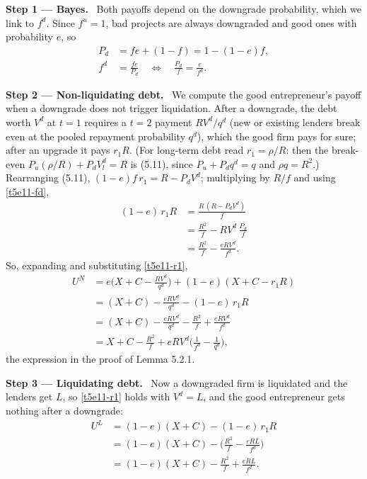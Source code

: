 \documentclass[11pt,a4paper]{article}
\newcommand{\step}[2]{\par\medskip\noindent\textbf{Step #1 --- #2.}~}
\begin{document}
\step{1}{Bayes} Both payoffs depend on the downgrade probability, which we link to $f^d$. Since $f^u=1$,
bad projects are always downgraded and good ones with probability $e$, so
\begin{align}
  P_d &= fe+(1-f) = 1-(1-e)f, \label{t5e11-Pd}\\
  f^d &= \frac{fe}{P_d}\quad\Longleftrightarrow\quad \frac{P_d}{f}=\frac{e}{f^d}. \label{t5e11-fd}
\end{align}

\step{2}{Non-liquidating debt} We compute the good entrepreneur's payoff when a downgrade does not
trigger liquidation. After a downgrade, the debt worth $V^d$ at $t=1$ requires a $t=2$ payment
$RV^d/q^d$ (new or existing lenders break even at the pooled repayment probability $q^d$), which the good
firm pays for sure; after an upgrade it pays $r_1R$. (For long-term debt read $r_1=\rho/R$: then the
break-even $P_u(\rho/R)+P_dV_l^d=R$ is (5.11), since $P_u+P_dq^d=q$ and $\rho q=R^2$.) Rearranging (5.11),
$(1-e)f\,r_1=R-P_dV^d$; multiplying by $R/f$ and using \eqref{t5e11-fd},
\begin{align}
  (1-e)\,r_1R &= \frac{R\,(R-P_dV^d)}{f} \nonumber\\
              &= \frac{R^2}{f}-RV^d\,\frac{P_d}{f} \nonumber\\
              &= \frac{R^2}{f}-\frac{eRV^d}{f^d}. \label{t5e11-r1}
\end{align}
So, expanding and substituting \eqref{t5e11-r1},
\begin{align}
  U^N &= e\Big(X+C-\frac{RV^d}{q^d}\Big)+(1-e)(X+C-r_1R) \nonumber\\
      &= (X+C)-\frac{eRV^d}{q^d}-(1-e)\,r_1R \nonumber\\
      &= (X+C)-\frac{eRV^d}{q^d}-\frac{R^2}{f}+\frac{eRV^d}{f^d} \nonumber\\
      &= X+C-\frac{R^2}{f}+eRV^d\Big(\frac{1}{f^d}-\frac{1}{q^d}\Big), \label{t5e11-UN}
\end{align}
the expression in the proof of Lemma 5.2.1.

\step{3}{Liquidating debt} Now a downgraded firm is liquidated and the lenders get $L$, so \eqref{t5e11-r1} holds with $V^d=L$, and the good
entrepreneur gets nothing after a downgrade:
\begin{align}
  U^L &= (1-e)(X+C) - (1-e)\,r_1R \nonumber\\
      &= (1-e)(X+C)-\Big(\frac{R^2}{f}-\frac{eRL}{f^d}\Big) \nonumber\\
      &= (1-e)(X+C)-\frac{R^2}{f}+\frac{eRL}{f^d}. \label{t5e11-UL}
\end{align}
\end{document}
